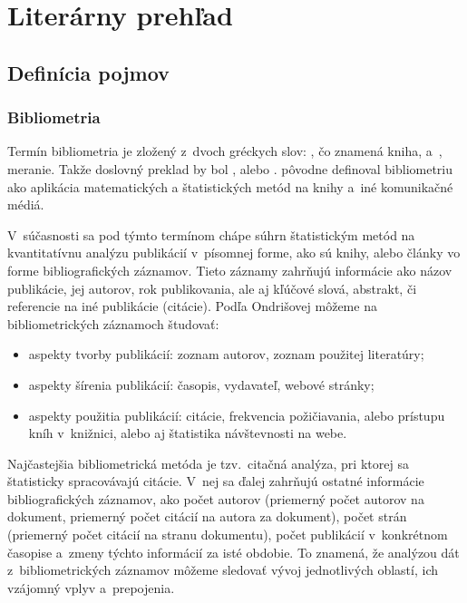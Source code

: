 \chapter{Literárny prehľad}
\label{chap:review}

\section{Definícia pojmov}

\subsection{Bibliometria}

Termín bibliometria je zložený z~dvoch gréckych slov:
, čo znamená kniha,
a~, meranie.  Takže doslovný
preklad by bol , alebo .
\citet{Pritchard1969} pôvodne definoval bibliometriu ako aplikácia matematických
a štatistických metód na knihy a~iné komunikačné médiá.

V~súčasnosti sa pod týmto termínom chápe súhrn štatistickým metód na
kvantitatívnu analýzu publikácií v~písomnej forme, ako sú knihy, alebo články vo
forme bibliografických záznamov.  Tieto záznamy zahrňujú informácie ako názov
publikácie, jej autorov, rok publikovania, ale aj kľúčové slová, abstrakt, či
referencie na iné publikácie (citácie).  Podľa Ondrišovej
\citeyearpar{Ondrisova2011} môžeme na bibliometrických záznamoch študovať:

\begin{itemize}
\item aspekty tvorby publikácií: zoznam autorov, zoznam použitej literatúry;
\item aspekty šírenia publikácií: časopis, vydavateľ, webové stránky;
\item aspekty použitia publikácií: citácie, frekvencia požičiavania, alebo
  prístupu kníh v~knižnici, alebo aj štatistika návštevnosti na webe.

\end{itemize}

Najčastejšia bibliometrická metóda je tzv.~citačná analýza, pri ktorej sa štatisticky spracovávajú citácie.  V~nej sa ďalej
zahrňujú ostatné informácie bibliografických záznamov, ako počet autorov
(priemerný počet autorov na dokument, priemerný počet citácií na autora za
dokument), počet strán (priemerný počet citácií na stranu dokumentu), počet
publikácií v~konkrétnom časopise a~zmeny týchto informácií za isté obdobie.  To
znamená, že analýzou dát z~bibliometrických záznamov môžeme sledovať vývoj
jednotlivých oblastí, ich vzájomný vplyv a~prepojenia.

